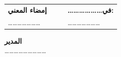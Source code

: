 \documentclass[12pt,a4paper]{article}
\begin{document}
	\vspace{1cm}
	
	
		\begin{center}
		\renewcommand{\arraystretch}{1.5}
		\begin{tabularx}{\textwidth}{XcrX}
			\textbf{ إمضاء المعني} & & &  \textbf{\dots\dots\dots\dots\dots\dots في:} \\
			\dots\dots\dots\dots\dots\dots\dots & & & \dots\dots\dots\dots\dots\dots\dots \\
		\end{tabularx}
	\end{center}
	\vspace{0.8cm}

	\begin{center}
		\textbf{ المدير} \\ \dots\dots\dots\dots\dots\dots\dots\dots\dots 
	\end{center}

	
\end{document}
